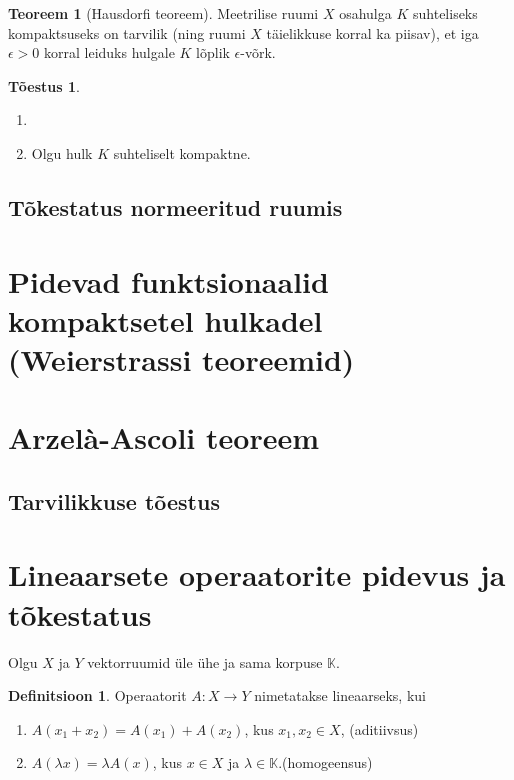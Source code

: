 \documentclass{article}[12pt]
\newcommand{\K}{\mathbb{K}}
\theoremstyle{definition}
\newtheorem{definition}{Definitsioon}[section]
\theoremstyle{definition}
\newtheorem{theorem}{Teoreem}[section]
\theoremstyle{definition}
\theoremstyle{break}
\newtheorem*{toestus}{Tõestus}
\begin{document}
\begin{theorem}[Hausdorfi teoreem]
	Meetrilise ruumi $X$ osahulga $K$ suhteliseks kompaktsuseks on tarvilik (ning ruumi $X$ täielikkuse korral ka piisav), et iga $\epsilon > 0$ korral leiduks hulgale $K$ lõplik $\epsilon$-võrk.
\end{theorem}
\begin{toestus}
	\begin{enumerate}
		\item[]
		\item Olgu hulk $K$ suhteliselt kompaktne.
	\end{enumerate}
\end{toestus}

\subsection{Tõkestatus normeeritud ruumis}

\section{Pidevad funktsionaalid kompaktsetel hulkadel (Weierstrassi teoreemid)}



\section{Arzelà-Ascoli teoreem}

\subsection{Tarvilikkuse tõestus}

\section{Lineaarsete operaatorite pidevus ja tõkestatus}

Olgu $X$ ja $Y$ vektorruumid üle ühe ja sama korpuse $\K$.

\begin{definition}
	Operaatorit $A:X\rightarrow Y$ nimetatakse lineaarseks, kui
	\begin{enumerate}
		\item $A(x_1+x_2) = A(x_1) + A(x_2)$, kus $x_1,x_2\in X$, \hfill (aditiivsus)
		\item $A(\lambda x) = \lambda A(x)$, kus $x\in X$ ja $\lambda \in \K$.\hfill (homogeensus)
	\end{enumerate}
\end{definition}
\end{document}
